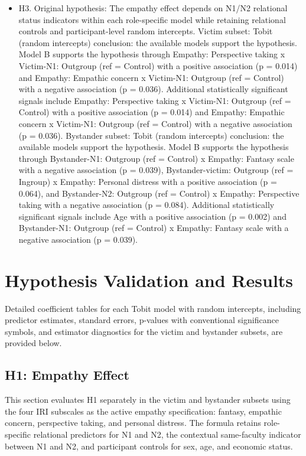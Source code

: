 \documentclass[11pt]{article}
\begin{document}
\begin{itemize}
\item H3. Original hypothesis: The empathy effect depends on N1/N2 relational status indicators within each role-specific model while retaining relational controls and participant-level random intercepts. Victim subset: Tobit (random intercepts) conclusion: the available models support the hypothesis. Model B supports the hypothesis through Empathy: Perspective taking x Victim-N1: Outgroup (ref = Control) with a positive association (p = 0.014) and Empathy: Empathic concern x Victim-N1: Outgroup (ref = Control) with a negative association (p = 0.036). Additional statistically significant signals include Empathy: Perspective taking x Victim-N1: Outgroup (ref = Control) with a positive association (p = 0.014) and Empathy: Empathic concern x Victim-N1: Outgroup (ref = Control) with a negative association (p = 0.036). Bystander subset: Tobit (random intercepts) conclusion: the available models support the hypothesis. Model B supports the hypothesis through Bystander-N1: Outgroup (ref = Control) x Empathy: Fantasy scale with a negative association (p = 0.039), Bystander-victim: Outgroup (ref = Ingroup) x Empathy: Personal distress with a positive association (p = 0.064), and Bystander-N2: Outgroup (ref = Control) x Empathy: Perspective taking with a negative association (p = 0.084). Additional statistically significant signals include Age with a positive association (p = 0.002) and Bystander-N1: Outgroup (ref = Control) x Empathy: Fantasy scale with a negative association (p = 0.039).
\end{itemize}

\section{Hypothesis Validation and Results}
Detailed coefficient tables for each Tobit model with random intercepts, including predictor estimates, standard errors, p-values with conventional significance symbols, and estimator diagnostics for the victim and bystander subsets, are provided below.

\subsection{H1: Empathy Effect}
This section evaluates H1 separately in the victim and bystander subsets using the four IRI subscales as the active empathy specification: fantasy, empathic concern, perspective taking, and personal distress. The formula retains role-specific relational predictors for N1 and N2, the contextual same-faculty indicator between N1 and N2, and participant controls for sex, age, and economic status.
\end{document}
